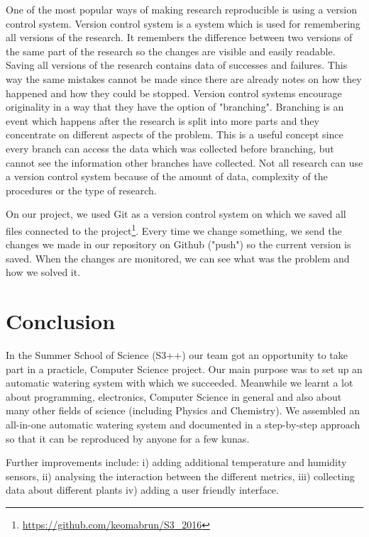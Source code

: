 \documentclass[conference]{IEEEtran}
\begin{document}
One of the most popular ways of making research reproducible is using a version control system.
Version control system is a system which is used for remembering all versions of the research.
It remembers the difference between two versions of the same part of the research so the changes are visible and easily readable.
Saving all versions of the research contains data of successes and failures.
This way the same mistakes cannot be made since there are already notes on how they happened and how they could be stopped.
Version control systems encourage originality in a way that they have the option of "branching".
Branching is an event which happens after the research is split into more parts and they concentrate on different aspects of the problem.
This is a useful concept since every branch can access the data which was collected before branching, but cannot see the information other branches have collected.
Not all research can use a version control system because of the amount of data, complexity of the procedures or the type of research.


On our project, we used Git as a version control system on which we saved all files connected to the project\footnote{\url{https://github.com/keomabrun/S3_2016}}.
Every time we change something, we send the changes we made in our repository on Github ("push") so the current version is saved.
When the changes are monitored, we can see what was the problem and how we solved it.


\section{Conclusion}
\label{sec:conclusion}


In the Summer School of Science (S3++) our team got an opportunity to take part in a practicle, Computer Science project.
Our main purpose was to set up an automatic watering system with which we succeeded.
Meanwhile we learnt a lot about programming, electronics, Computer Science in general and also about many other fields of science (including Physics and Chemistry).
We assembled an all-in-one automatic watering system and documented in a step-by-step approach so that it can be reproduced by anyone for a few kunas.


Further improvements include:
i) adding additional temperature and humidity sensors,
ii) analysing the interaction between the different metrics,
iii) collecting data about different plants
iv) adding a user friendly interface.
\end{document}
